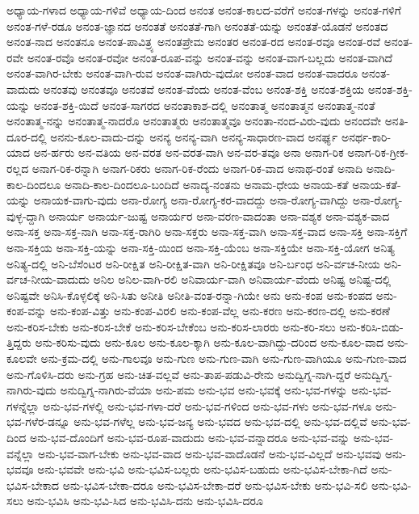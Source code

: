 {ಅಧ್ಯಾಯ-ಗಳಾದ
ಅಧ್ಯಾಯ-ಗಳಿವೆ
ಅಧ್ಯಾಯ-ದಿಂದ
ಅನಂತ
ಅನಂತ-ಕಾಲದ-ವರೆಗೆ
ಅನಂತ-ಗಳನ್ನು
ಅನಂತ-ಗಳಿಗೆ
ಅನಂತ-ಗಳೆ-ರಡೂ
ಅನಂತ-ಜ್ಞಾನದ
ಅನಂತತೆ
ಅನಂತತೆ-ಗಾಗಿ
ಅನಂತತೆ-ಯನ್ನು
ಅನಂತತೆ-ಯೊಡನೆ
ಅನಂತದ
ಅನಂತ-ನಾದ
ಅನಂತನೂ
ಅನಂತ-ಪಾವಿತ್ರ್ಯ
ಅನಂತಪ್ರೇಮ
ಅನಂತರ
ಅನಂತ-ರದ
ಅನಂತ-ರವೂ
ಅನಂತ-ರವೆ
ಅನಂತ-ರವೇ
ಅನಂತ-ರವೊ
ಅನಂತ-ರವೋ
ಅನಂತ-ರೂಪ-ವನ್ನು
ಅನಂತ-ವನ್ನು
ಅನಂತ-ವಾಗ-ಬಲ್ಲದು
ಅನಂತ-ವಾಗಿದೆ
ಅನಂತ-ವಾಗಿರ-ಬೇಕು
ಅನಂತ-ವಾಗಿ-ರುವ
ಅನಂತ-ವಾಗಿರು-ವುದೋ
ಅನಂತ-ವಾದ
ಅನಂತ-ವಾದರೂ
ಅನಂತ-ವಾದುದು
ಅನಂತವು
ಅನಂತವೂ
ಅನಂತವೆ
ಅನಂತ-ವೆಂದು
ಅನಂತ-ವೆಂಬ
ಅನಂತ-ಶಕ್ತಿ
ಅನಂತ-ಶಕ್ತಿಯ
ಅನಂತ-ಶಕ್ತಿ-ಯನ್ನು
ಅನಂತ-ಶಕ್ತಿ-ಯಿದೆ
ಅನಂತ-ಸಾಗರದ
ಅನಂತಾಕಾಶ-ದಲ್ಲಿ
ಅನಂತಾತ್ಮ
ಅನಂತಾತ್ಮನ
ಅನಂತಾತ್ಮ-ನಂತೆ
ಅನಂತಾತ್ಮ-ನನ್ನು
ಅನಂತಾತ್ಮ-ನಾದರೊ
ಅನಂತಾತ್ಮರು
ಅನಂತಾತ್ಮವೂ
ಅನಂತಾ-ನಂದ-ವಿರು-ವುದು
ಅನಂದವೇ
ಅನತಿ-ದೂರ-ದಲ್ಲಿ
ಅನನು-ಕೂಲ-ವಾದು-ದನ್ನು
ಅನನ್ಯ
ಅನನ್ಯ-ವಾಗಿ
ಅನನ್ಯ-ಸಾಧಾರಣ-ವಾದ
ಅನರ್ಘ್ಯ
ಅನರ್ಥ-ಕಾರಿ-ಯಾದ
ಅನ-ರ್ಹರು
ಅನ-ವತಿಯ
ಅನ-ವರತ
ಅನ-ವರತ-ವಾಗಿ
ಅನ-ವರ-ತವೂ
ಅನಾ
ಅನಾಗ-ರಿಕ
ಅನಾಗ-ರಿಕ-ಗ್ರೀಕ-ರಲ್ಲದ
ಅನಾಗ-ರಿಕ-ರನ್ನಾಗಿ
ಅನಾಗ-ರಿಕರು
ಅನಾಗ-ರಿಕ-ರೆಂದು
ಅನಾಗ-ರಿಕ-ವಾದ
ಅನಾಥ-ರಂತೆ
ಅನಾದಿ
ಅನಾದಿ-ಕಾಲ-ದಿಂದಲೂ
ಅನಾದಿ-ಕಾಲ-ದಿಂದಲೂ-ಬಂದಿದೆ
ಅನಾದ್ಯ-ನಂತನು
ಅನಾಮ-ಧೇಯ
ಅನಾಯ-ಕತೆ
ಅನಾಯ-ಕತೆ-ಯನ್ನು
ಅನಾಯಕ-ವಾಗು-ವುದು
ಅನಾ-ರೋಗ್ಯ
ಅನಾ-ರೋಗ್ಯ-ಕರ-ವಾದದ್ದು
ಅನಾ-ರೋಗ್ಯ-ವಾಗಿದ್ದು
ಅನಾ-ರೋಗ್ಯ-ವುಳ್ಳ-ದ್ದಾಗಿ
ಅನಾರ್ಯ
ಅನಾರ್ಯ-ಜುಷ್ಟ
ಅನಾರ್ಯರ
ಅನಾ-ವರಣ-ವಾದಂತಾ
ಅನಾ-ವಶ್ಯಕ
ಅನಾ-ವಶ್ಯಕ-ವಾದ
ಅನಾ-ಸಕ್ತ
ಅನಾ-ಸಕ್ತ-ನಾಗಿ
ಅನಾ-ಸಕ್ತ-ರಾಗಿರಿ
ಅನಾ-ಸಕ್ತರು
ಅನಾ-ಸಕ್ತ-ವಾಗಿ
ಅನಾ-ಸಕ್ತ-ವಾದ
ಅನಾ-ಸಕ್ತಿ
ಅನಾ-ಸಕ್ತಿಗೆ
ಅನಾ-ಸಕ್ತಿಯ
ಅನಾ-ಸಕ್ತಿ-ಯನ್ನು
ಅನಾ-ಸಕ್ತಿ-ಯಿಂದ
ಅನಾ-ಸಕ್ತಿ-ಯೆಂಬ
ಅನಾ-ಸಕ್ತಿಯೇ
ಅನಾ-ಸಕ್ತಿ-ಯೋಗ
ಅನಿತ್ಯ
ಅನಿತ್ಯ-ದಲ್ಲಿ
ಅನಿ-ಬೆಸೆಂಟರ
ಅನಿ-ರೀಕ್ಷಿತ
ಅನಿ-ರೀಕ್ಷಿತ-ವಾಗಿ
ಅನಿ-ರೀಕ್ಷಿತವೂ
ಅನಿ-ರ್ಬಂಧ
ಅನಿ-ರ್ವಚ-ನೀಯ
ಅನಿ-ರ್ವಚ-ನೀಯ-ವಾದುದು
ಅನಿಲ
ಅನಿಲ-ವಾಗಿ-ರಲಿ
ಅನಿವಾರ್ಯ-ವಾಗಿ
ಅನಿವಾರ್ಯ-ವೆಂದು
ಅನಿಷ್ಟ
ಅನಿಷ್ಟ-ದಲ್ಲಿ
ಅನಿಷ್ಟವೇ
ಅನಿಸಿ-ಕೊಳ್ಳಲಿಕ್ಕೆ
ಅನಿ-ಸಿತು
ಅನೀತಿ
ಅನೀತಿ-ವಂತ-ರನ್ನಾ-ಗಿಯೇ
ಅನು
ಅನು-ಕಂಪ
ಅನು-ಕಂಪದ
ಅನು-ಕಂಪ-ವನ್ನು
ಅನು-ಕಂಪ-ವಿತ್ತು
ಅನು-ಕಂಪ-ವಿರಲಿ
ಅನು-ಕಂಪ-ವೆಲ್ಲ
ಅನು-ಕರಣ
ಅನು-ಕರಣ-ದಲ್ಲಿ
ಅನು-ಕರಣೆ
ಅನು-ಕರಿಸ-ಬೇಕು
ಅನು-ಕರಿಸ-ಬೇಕೆ
ಅನು-ಕರಿಸ-ಬೇಕೆಂಬ
ಅನು-ಕರಿಸ-ಲಾರರು
ಅನು-ಕರಿ-ಸಲು
ಅನು-ಕರಿಸಿ-ಬಿಡು-ತ್ತಿದ್ದರು
ಅನು-ಕರಿಸು-ವುದು
ಅನು-ಕೂಲ
ಅನು-ಕೂಲ-ಕ್ಕಾಗಿ
ಅನು-ಕೂಲ-ವಾಗಿದ್ದು-ದರಿಂದ
ಅನು-ಕೂಲ-ವಾದ
ಅನು-ಕೂಲವೇ
ಅನು-ಕ್ರಮ-ದಲ್ಲಿ
ಅನು-ಗಾಲವೂ
ಅನು-ಗುಣ
ಅನು-ಗುಣ-ವಾಗಿ
ಅನು-ಗುಣ-ವಾಗಿಯೂ
ಅನು-ಗುಣ-ವಾದ
ಅನು-ಗೊಳಿಸಿ-ದರು
ಅನು-ಗ್ರಹ
ಅನು-ಚಿತ-ವಲ್ಲವೆ
ಅನು-ತಾಪ-ಪಡುವಿ-ರೇನು
ಅನುದ್ವಿಗ್ನ-ನಾಗಿ-ದ್ದರೆ
ಅನುದ್ವಿಗ್ನ-ನಾಗಿರು-ವುದು
ಅನುದ್ವಿಗ್ನ-ನಾಗಿರು-ವೆಯಾ
ಅನು-ಪಮ
ಅನು-ಭವ
ಅನು-ಭವಕ್ಕೆ
ಅನು-ಭವ-ಗಳನ್ನು
ಅನು-ಭವ-ಗಳನ್ನೆಲ್ಲಾ
ಅನು-ಭವ-ಗಳಲ್ಲಿ
ಅನು-ಭವ-ಗಳಾ-ದರೆ
ಅನು-ಭವ-ಗಳಿಂದ
ಅನು-ಭವ-ಗಳು
ಅನು-ಭವ-ಗಳೂ
ಅನು-ಭವ-ಗಳೆರ-ಡನ್ನೂ
ಅನು-ಭವ-ಗಳೆಲ್ಲ
ಅನು-ಭವ-ಜನ್ಯ
ಅನು-ಭವದ
ಅನು-ಭವ-ದಲ್ಲಿ
ಅನು-ಭವ-ದಲ್ಲಿವೆ
ಅನು-ಭವ-ದಿಂದ
ಅನು-ಭವ-ದೊಂದಿಗೆ
ಅನು-ಭವ-ರೂಪ-ವಾದುದು
ಅನು-ಭವ-ವನ್ನಾದರೂ
ಅನು-ಭವ-ವನ್ನು
ಅನು-ಭವ-ವನ್ನೆಲ್ಲಾ
ಅನು-ಭವ-ವಾಗ-ಬೇಕು
ಅನು-ಭವ-ವಾದ
ಅನು-ಭವ-ವಾದೊಡನೆ
ಅನು-ಭವ-ವಿಲ್ಲದೆ
ಅನು-ಭವವು
ಅನು-ಭವವೂ
ಅನು-ಭವವೇ
ಅನು-ಭವಿ
ಅನು-ಭವಿಸ-ಬಲ್ಲರು
ಅನು-ಭವಿಸ-ಬಹುದು
ಅನು-ಭವಿಸ-ಬೇಕಾ-ಗಿದೆ
ಅನು-ಭವಿಸ-ಬೇಕಾದ
ಅನು-ಭವಿಸ-ಬೇಕಾ-ದರೂ
ಅನು-ಭವಿಸ-ಬೇಕಾ-ದರೆ
ಅನು-ಭವಿಸ-ಬೇಕು
ಅನು-ಭವಿ-ಸಲಿ
ಅನು-ಭವಿ-ಸಲು
ಅನು-ಭವಿಸಿ
ಅನು-ಭವಿ-ಸಿದ
ಅನು-ಭವಿಸಿ-ದನು
ಅನು-ಭವಿಸಿ-ದರೂ
}

